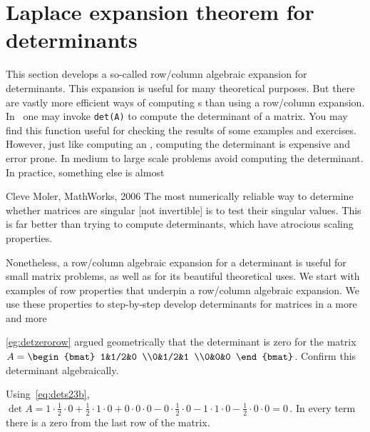 

\section{Laplace expansion theorem for determinants}
\label{sec:apd}


This section develops a so-called row\slash column algebraic expansion for determinants. 
This expansion is useful for many theoretical purposes.
But there are vastly more efficient ways of computing s than using a row\slash column expansion.  
In \script\ one may invoke \verb|det(A)| to compute the determinant of a matrix.
You may find this function useful for checking the results of some examples and exercises.
However, just like computing an , computing the determinant is expensive and error prone.  
In medium to large scale problems avoid computing the determinant.
In practice, something else is almost 

\begin{quoted}{Cleve Moler, MathWorks, 2006}
The most numerically reliable way to determine whether matrices are singular [not invertible] is to test their singular values. 
This is far better than trying to compute determinants, which have atrocious scaling properties.
\end{quoted}

Nonetheless, a row\slash column algebraic expansion for a determinant is useful for small matrix problems, as well as for its beautiful  theoretical uses.
We start with examples of row properties that underpin a row\slash column algebraic expansion.
We use these properties to step-by-step develop determinants for matrices in a more and more 





\begin{example} \label{eg:detzerorowii}
\cref{eg:detzerorow} argued geometrically that the determinant is zero for the matrix
\(A=\begin{bmat} 1&1/2&0
\\0&1/2&1 \\0&0&0 \end{bmat}\).
Confirm this determinant algebraically.
\begin{solution} 
Using~\eqref{eq:dets23b}, \(\det A
=1\cdot\frac12\cdot0+\frac12\cdot1\cdot0+0\cdot0\cdot0
-0\cdot\frac12\cdot0-1\cdot1\cdot0-\frac12\cdot0\cdot0
=0\)\,.  
In every term there is a zero from the last row of the matrix.
\end{solution}
\end{example}



